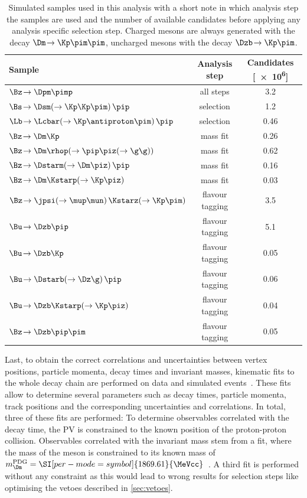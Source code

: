 \begin{table}[tbp]
	\centering
	\caption{Simulated samples used in this analysis with a short note in which analysis step the samples are used and the number of available candidates before applying any analysis specific selection step.
	Charged \D mesons are always generated with the decay $\Dm\!\to\Kp\pim\pim$, uncharged \D mesons with the decay $\Dzb\!\to\Kp\pim$.}
	\begin{tabular}{lcS[table-format=1.2]}
		\toprule
		Sample & Analysis step & {Candidates [\num{e6}]}\\
		\midrule
		$\Bz\!\to\Dpm\pimp$ 														& all steps & 3.2 \\
		$\Bs\!\to\Dsm\!\left(\to\Kp\Kp\pim\right)\pip$  							& selection & 1.2 \\
		$\Lb\!\to\Lcbar\!\left(\to\Kp\antiproton\pim\right)\pip$ 					& selection & 0.46 \\
		$\Bz\!\to\Dm\Kp$ 															& mass fit & 0.26 \\
		$\Bz\!\to\Dm\rhop\!\left(\to\pip\piz\!\left(\to\g\g\right)\right)$ 			& mass fit & 0.62 \\
		$\Bz\!\to\Dstarm\!\left(\to\Dm\piz\right)\pip$ 								& mass fit & 0.16 \\
		$\Bz\!\to\Dm\Kstarp\!\left(\to\Kp\piz\right)$ 								& mass fit & 0.03 \\
		$\Bz\!\to\jpsi\!\left(\to\mup\mun\right)\Kstarz\!\left(\to\Kp\pim\right)$ 	& flavour tagging & 3.5 \\
		$\Bu\!\to\Dzb\pip$ 															& flavour tagging & 5.1 \\
		$\Bu\!\to\Dzb\Kp$ 															& flavour tagging & 0.05 \\
		$\Bu\!\to\Dstarb\!\left(\to\Dz\g\right)\pip$ 								& flavour tagging & 0.06 \\
		$\Bu\!\to\Dzb\Kstarp\!\left(\to\Kp\piz\right)$ 								& flavour tagging & 0.04 \\
		$\Bz\!\to\Dzb\pip\pim$ 														& flavour tagging & 0.05 \\
		\bottomrule
	\end{tabular}
	\label{tab:simSamples}
\end{table}

Last, to obtain the correct correlations and uncertainties between vertex positions, particle momenta, decay times and invariant masses, kinematic fits to the whole decay chain are performed on data and simulated events~\cite{2005NIMPA}.
These fits allow to determine several parameters such as decay times, particle momenta, track positions and the corresponding uncertainties and correlations.
In total, three of these fits are performed: To determine observables correlated with the decay time, the \ac{PV} is constrained to the known position of the proton-proton collision.
Observables correlated with the invariant mass stem from a fit, where the mass of the \Dm meson is constrained to its known mass of \mbox{$m_\Dm^{\text{PDG}}=\SI[per-mode=symbol]{1869.61}{\MeVcc}$~\cite{PDG2018}}.
A third fit is performed without any constraint as this would lead to wrong results for selection steps like optimising the vetoes described in \cref{sec:vetoes}.

